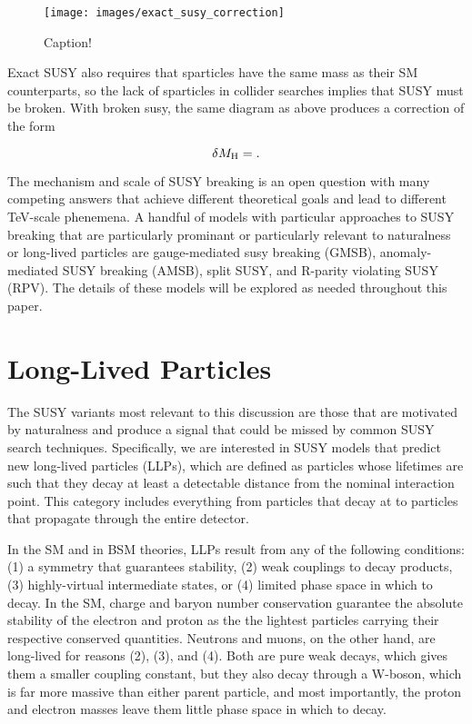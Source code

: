 \documentclass[12pt]{article}
\begin{document}
    \noindent \begin{figure}[htbp] \begin{center}
    \texttt{[image: images/exact\_susy\_correction]}
    \caption{Caption!}
    \label{exact_susy_correction}
    \end{center} \end{figure}

    Exact SUSY also requires that sparticles have the same mass as their SM counterparts, so the lack of sparticles in collider searches implies that SUSY must be broken. With broken susy, the same diagram as above produces a correction of the form

    \noindent \begin{equation}
    \delta M_{\mathrm{H}} = .
    \label{higgs_susy_correction}
    \end{equation}  
    
    The mechanism and scale of SUSY breaking is an open question with many competing answers that achieve different theoretical goals and lead to different TeV-scale phenemena. A handful of models with particular approaches to SUSY breaking that are particularly prominant or particularly relevant to naturalness or long-lived particles are gauge-mediated susy breaking (GMSB), anomaly-mediated SUSY breaking (AMSB), split SUSY, and R-parity violating SUSY (RPV). The details of these models will be explored as needed throughout this paper.

\section{Long-Lived Particles}
    The SUSY variants most relevant to this discussion are those that are motivated by naturalness and  produce a signal that could be missed by common SUSY search techniques. Specifically, we are interested in SUSY models that predict new long-lived particles (LLPs), which are defined as particles whose lifetimes are such that they decay at least a detectable distance from the nominal interaction point. This category includes everything from particles that decay at  to particles that propagate through the entire detector. 

    In the SM and in BSM theories, LLPs result from any of the following conditions: (1) a symmetry that guarantees stability, (2) weak couplings to decay products, (3) highly-virtual intermediate states, or (4) limited phase space in which to decay. In the SM, charge and baryon number conservation guarantee the absolute stability of the electron and proton as the the lightest particles carrying their respective conserved quantities. Neutrons and muons, on the other hand, are long-lived for reasons (2), (3), and (4). Both are pure weak decays, which gives them a smaller coupling constant, but they also decay through a W-boson, which is far more massive than either parent particle, and most importantly, the proton and electron masses leave them little phase space in which to decay.   
\end{document}
